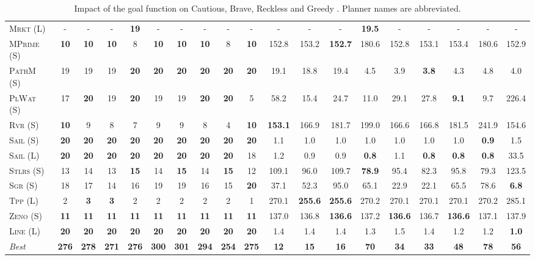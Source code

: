\documentclass[11pt,landscape]{article}
\begin{document}
\begin{table}[tb]
{\begin{tabular}{|l||ccccccccc||ccccccccc||}
\textsc{Mrkt} (L)&-&-&-&\textbf{19}&-&-&-&-&-&-&-&-&\textbf{19.5}&-&-&-&-&-\\
\textsc{MPrime} (S)&\textbf{10}&\textbf{10}&\textbf{10}&8&\textbf{10}&\textbf{10}&\textbf{10}&8&\textbf{10}&152.8&153.2&\textbf{152.7}&180.6&152.8&153.1&153.4&180.6&152.9\\
\textsc{PathM} (S)&19&19&19&\textbf{20}&\textbf{20}&\textbf{20}&\textbf{20}&\textbf{20}&\textbf{20}&19.1&18.8&19.4&4.5&3.9&\textbf{3.8}&4.3&4.8&4.0\\
\textsc{PlWat} (S)&17&\textbf{20}&19&\textbf{20}&19&19&\textbf{20}&\textbf{20}&5&58.2&15.4&24.7&11.0&29.1&27.8&\textbf{9.1}&9.7&226.4\\
\textsc{Rvr} (S)&\textbf{10}&9&8&7&9&9&8&4&\textbf{10}&\textbf{153.1}&166.9&181.7&199.0&166.6&166.8&181.5&241.9&154.6\\
\textsc{Sail} (S)&\textbf{20}&\textbf{20}&\textbf{20}&\textbf{20}&\textbf{20}&\textbf{20}&\textbf{20}&\textbf{20}&\textbf{20}&1.1&1.0&1.0&1.0&1.0&1.0&1.0&\textbf{0.9}&1.5\\
\textsc{Sail} (L)&\textbf{20}&\textbf{20}&\textbf{20}&\textbf{20}&\textbf{20}&\textbf{20}&\textbf{20}&\textbf{20}&18&1.2&0.9&0.9&\textbf{0.8}&1.1&\textbf{0.8}&\textbf{0.8}&\textbf{0.8}&33.5\\
\textsc{Stlrs} (S)&13&14&13&\textbf{15}&14&\textbf{15}&14&\textbf{15}&12&109.1&96.0&109.7&\textbf{78.9}&95.4&82.3&95.8&79.3&123.5\\
\textsc{Sgr} (S)&18&17&14&16&19&19&16&15&\textbf{20}&37.1&52.3&95.0&65.1&22.9&22.1&65.5&78.6&\textbf{6.8}\\
\textsc{Tpp} (L)&2&\textbf{3}&\textbf{3}&2&2&2&2&2&1&270.1&\textbf{255.6}&\textbf{255.6}&270.2&270.1&270.1&270.1&270.2&285.1\\
\textsc{Zeno} (S)&\textbf{11}&\textbf{11}&\textbf{11}&\textbf{11}&\textbf{11}&\textbf{11}&\textbf{11}&\textbf{11}&\textbf{11}&137.0&136.8&\textbf{136.6}&137.2&\textbf{136.6}&136.7&\textbf{136.6}&137.1&137.9\\
\textsc{Line} (L)&\textbf{20}&\textbf{20}&\textbf{20}&\textbf{20}&\textbf{20}&\textbf{20}&\textbf{20}&\textbf{20}&\textbf{20}&1.4&1.4&1.4&1.3&1.5&1.4&1.2&1.2&\textbf{1.0}
\\\hline
\textit{Best}&\textbf{276}&\textbf{278}&\textbf{271}&\textbf{276}&\textbf{300}&\textbf{301}&\textbf{294}&\textbf{254}&\textbf{275}&\textbf{12}&\textbf{15}&\textbf{16}&\textbf{70}&\textbf{34}&\textbf{33}&\textbf{48}&\textbf{78}&\textbf{56}\\\hline

        \end{tabular}}
        \caption{Impact of the goal function on Cautious, Brave, Reckless and Greedy \pattyd. Planner names are abbreviated.}
        \label{tab:abl-gf}
        \end{table}
        
\end{document}
